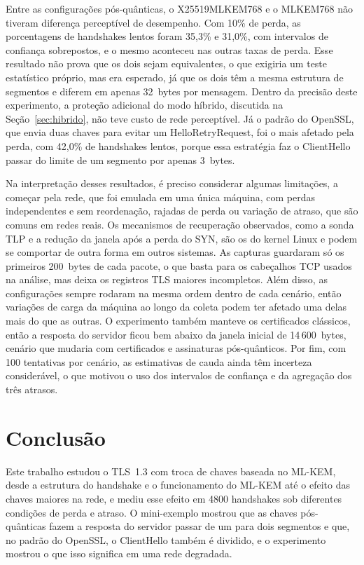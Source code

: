 \documentclass[12pt,a4paper]{article}
\begin{document}
Entre as configurações pós-quânticas, o X25519MLKEM768 e o MLKEM768 não
tiveram diferença perceptível de desempenho. Com 10\% de perda, as
porcentagens de handshakes lentos foram 35,3\% e 31,0\%, com intervalos de
confiança sobrepostos, e o mesmo aconteceu nas outras taxas de perda. Esse
resultado não prova que os dois sejam equivalentes, o que exigiria um teste
estatístico próprio, mas era esperado, já que os dois têm a mesma estrutura
de segmentos e diferem em apenas 32~bytes por mensagem. Dentro da
precisão deste experimento, a proteção adicional do modo híbrido, discutida
na Seção~\ref{sec:hibrido}, não teve custo de rede perceptível. Já o padrão
do OpenSSL, que envia duas chaves para evitar um HelloRetryRequest, foi o
mais afetado pela perda, com 42,0\% de handshakes lentos, porque essa
estratégia faz o ClientHello passar do limite de um segmento por apenas
3~bytes.

Na interpretação desses resultados, é preciso considerar algumas
limitações, a começar pela rede, que foi emulada em uma única máquina, com perdas
independentes e sem reordenação, rajadas de perda ou variação de atraso,
que são comuns em redes reais. Os mecanismos de recuperação observados,
como a sonda TLP e a redução da janela após a perda do SYN, são os do
kernel Linux e podem se comportar de outra forma em outros sistemas. As
capturas guardaram só os primeiros 200~bytes de cada pacote, o que basta
para os cabeçalhos TCP usados na análise, mas deixa os registros TLS
maiores incompletos. Além disso, as configurações sempre rodaram na mesma
ordem dentro de cada cenário, então variações de carga da máquina ao longo
da coleta podem ter afetado uma delas mais do que as outras. O experimento também manteve os certificados clássicos, então a resposta do
servidor ficou bem abaixo da janela inicial de 14\,600~bytes, cenário que
mudaria com certificados e assinaturas pós-quânticos. Por fim, com 100
tentativas por cenário, as estimativas de cauda ainda têm incerteza
considerável, o que motivou o uso dos intervalos de confiança e da
agregação dos três atrasos.


\section{Conclusão}
\label{sec:conclusao}

Este trabalho estudou o TLS~1.3 com troca de chaves baseada no ML-KEM, desde
a estrutura do handshake e o funcionamento do ML-KEM até o efeito das
chaves maiores na rede, e mediu esse efeito em 4800 handshakes sob
diferentes condições de perda e atraso. O mini-exemplo mostrou que as
chaves pós-quânticas fazem a resposta do servidor passar de um para dois
segmentos e que, no padrão do OpenSSL, o ClientHello também é dividido, e o
experimento mostrou o que isso significa em uma rede degradada.
\end{document}
